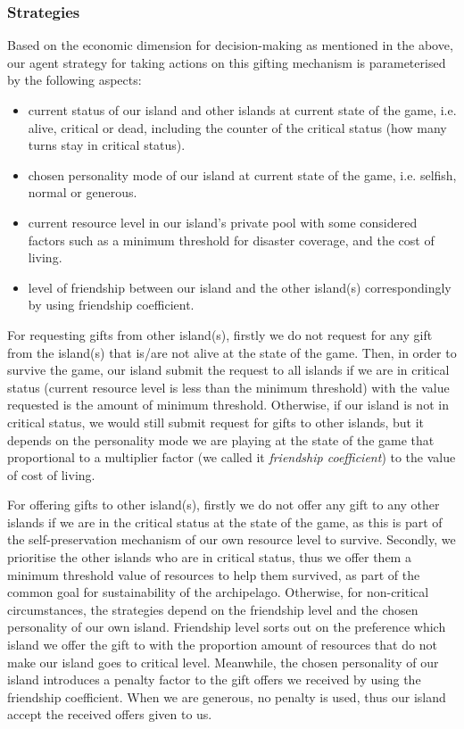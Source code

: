\subsubsection{Strategies} \label{subsubsec:Team6_IITO:Strategies}
Based on the economic dimension for decision-making as mentioned in the above, our agent strategy for taking actions on this gifting mechanism is parameterised by the following aspects:
\begin{itemize}
    \item current status of our island and other islands at current state of the game, i.e. alive, critical or dead, including the counter of the critical status (how many turns stay in critical status).
    \item chosen personality mode of our island at current state of the game, i.e. selfish, normal or generous.
    \item current resource level in our island's private pool with some considered factors such as a minimum threshold for disaster coverage, and the cost of living.
    \item level of friendship between our island and the other island(s) correspondingly by using friendship coefficient.
\end{itemize}
For requesting gifts from other island(s), firstly we do not request for any gift from the island(s) that is/are not alive at the state of the game. Then, in order to survive the game, our island submit the request to all islands if we are in critical status (current resource level is less than the minimum threshold) with the value requested is the amount of minimum threshold. Otherwise, if our island is not in critical status, we would still submit request for gifts to other islands, but it depends on the personality mode we are playing at the state of the game that proportional to a multiplier factor (we called it \emph{friendship coefficient}) to the value of cost of living.

For offering gifts to other island(s), firstly we do not offer any gift to any other islands if we are in the critical status at the state of the game, as this is part of the self-preservation mechanism of our own resource level to survive. Secondly, we prioritise the other islands who are in critical status, thus we offer them a minimum threshold value of resources to help them survived, as part of the common goal for sustainability of the archipelago. Otherwise, for non-critical circumstances, the strategies depend on the friendship level and the chosen personality of our own island. Friendship level sorts out on the preference which island we offer the gift to with the proportion amount of resources that do not make our island goes to critical level. Meanwhile, the chosen personality of our island introduces a penalty factor to the gift offers we received by using the friendship coefficient. When we are generous, no penalty is used, thus our island accept the received offers given to us.

